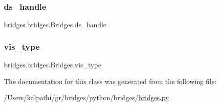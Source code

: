 \mbox{\label{classbridges_1_1bridges_1_1_bridges_a7a6f25612be64d4f3e203d7d37cb4da4}} 
\subsubsection{\texorpdfstring{ds\_handle}{ds\_handle}}
{\footnotesize\ttfamily bridges.\+bridges.\+Bridges.\+ds\+\_\+handle}

\mbox{\label{classbridges_1_1bridges_1_1_bridges_a5ca152bf3830e2be1f72247463916f82}} 
\subsubsection{\texorpdfstring{vis\_type}{vis\_type}}
{\footnotesize\ttfamily bridges.\+bridges.\+Bridges.\+vis\+\_\+type}



The documentation for this class was generated from the following file\+:\begin{DoxyCompactItemize}
\item 
/\+Users/kalpathi/gr/bridges/python/bridges/\mbox{\hyperlink{bridges_8py}{bridges.\+py}}\end{DoxyCompactItemize}

